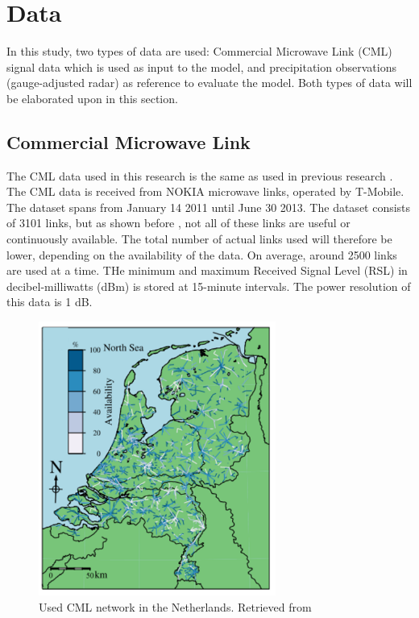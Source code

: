 \documentclass[twocolumn, 10pt, a4paper]{memoir}
\begin{document}
	
	
	
	
	
	 
	\cleardoublepage
	\chapter{Data}\vspace{-6mm}\label{ch: field}
	In this study, two types of data are used: Commercial Microwave Link (CML) signal data which is used as input to the model, and precipitation observations (gauge-adjusted radar) as reference to evaluate the model. Both types of data will be elaborated upon in this section.
	
	
	\section{Commercial Microwave Link} \label{sec: CML data}
	The CML data used in this research is the same as used in previous research .
	The CML data is received from NOKIA microwave links, operated by T-Mobile. The dataset spans from January 14 2011 until June 30 2013. The dataset consists of  3101 links, but as shown before , not all of these links are useful or continuously available. The total number of actual links used will therefore be lower, depending on the availability of the data. On average, around 2500 links are used at a time. THe minimum and maximum Received Signal Level (RSL) in decibel-milliwatts (dBm) is stored at 15-minute intervals. The power resolution of this data is 1 dB. 
	
	\begin{figure}[h]
		\includegraphics[height= 9cm]{Dutch_CML_network}
		\caption{Used CML network in the Netherlands. Retrieved from \protect{}}
		\label{fig: cmlnetworkmaps}	
	\end{figure}
\end{document}
